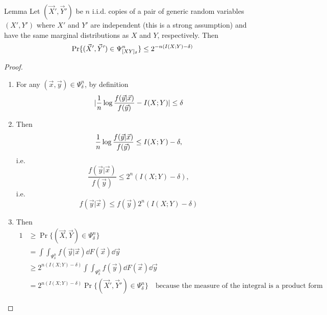 \documentclass[../main.tex]{subfiles}
\begin{document}
\begin{bbox}{Lemma}
    Let $(\vec X',\vec Y')$ be $n$ i.i.d. copies of a pair of generic random variables $(X',Y')$ where $X'$ and $Y'$ are independent (this is a strong assumption) and have the same marginal distributions as $X$ and $Y$, respectively. Then \[
    \Pr\{(\vec X',\vec Y')\in\Psi^n_{[XY]_\delta}\} \leq 2^{-n(I(X;Y)-\delta)}
    \]
    \begin{proof}
        \begin{enumerate}
            \item For any $(\vec x,\vec y)\in \Psi^n_\delta$, by definition \[
            |\frac{1}{n}\log\frac{f(\vec y|\vec x)}{f(\vec y)} - I(X;Y)|\leq \delta
            \]
            \item Then \[
            \frac{1}{n}\log\frac{f(\vec y|\vec x)}{f(\vec y)} \leq I(X;Y)-\delta,
            \] i.e. \[
            \frac{f(\vec y|\vec x)}{f(\vec y)}\leq 2^n(I(X;Y)-\delta), 
            \] i.e. 
            \[
            f(\vec y|\vec x)\leq f(\vec y)2^n(I(X;Y)-\delta)
            \]
            \item Then \begin{align*}
                1 &\geq \Pr\{(\vec X,\vec Y)\in \Psi^n_\delta\}\\
                &= \int\int_{\Psi^n_\delta}f(\vec y|\vec x)\dd F(\vec x)\dd \vec y \\
                &\geq 2^{n(I(X;Y)-\delta)}\int\int_{\Psi^n_\delta}f(\vec y)\dd F(\vec x)\dd \vec y\\
                &=2^{n(I(X;Y)-\delta)}\Pr\{(\vec X',\vec Y')\in\Psi^n_\delta\} \quad\text{because the measure of the integral is a product form}
            \end{align*}
        \end{enumerate}
    \end{proof}
\end{bbox}
\end{document}
